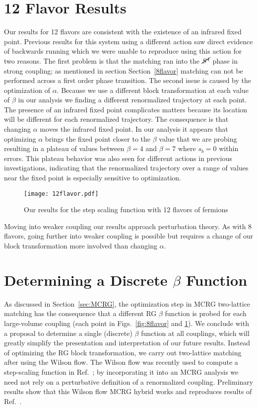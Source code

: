 \documentclass{PoS}
\newcommand{\Sb}{\ensuremath{\cancel{S^4}} }
\newcommand{\refcite}[1]{Ref.~\cite{#1}}
\newcommand{\secref}[1]{Section~\ref{#1}}
\begin{document}
\section{12 Flavor Results}
Our results for 12 flavors are consistent with the existence of an infrared fixed point.
Previous results for this system using a different action saw direct evidence of backwards running which we were unable to reproduce using this action for two reasons.
The first problem is that the matching ran into the \Sb phase in strong coupling; as mentioned in section \secref{8flavor} matching can not be performed across a first order phase transition. 
The second issue is caused by the optimization of $\alpha$.  Because we use a different block transformation at each value of $\beta$ in our analysis we finding a different renormalized trajectory at each point.
The presence of an infrared fixed point complicates matters because its location will be different for each renormalized trajectory.
The consequence is that changing $\alpha$ moves the infrared fixed point.
In our analysis it appears that optimizing $\alpha$ brings the fixed point closer to the $\beta$ value that we are probing resulting in a plateau of values between $\beta=4$ and $\beta=7$ where $s_b=0$ within errors.
This plateau behavior was also seen for different actions in previous investigations, indicating that the renormalized trajectory over a range of values near the fixed point is especially sensitive to optimization.

\begin{figure}[htpb]
  \centering
  \texttt{[image: 12flavor.pdf]}
  \caption{Our results for the step scaling function with 12 flavors of fermions}
  \label{fig:12flavor}
\end{figure}

Moving into weaker coupling our results approach perturbation theory.  As with 8 flavors, going further into weaker coupling is possible but requires a change of our block transformation more involved than changing $\alpha$.  

\section{Determining a Discrete $\beta$ Function}
As discussed in \secref{sec:MCRG}, the optimization step in MCRG two-lattice matching has the consequence that a different RG $\beta$ function is probed for each large-volume coupling (each point in Figs.~\ref{fig:8flavor} and \ref{fig:12flavor}).
We conclude with a proposal to determine a single (discrete) $\beta$ function at all couplings, which will greatly simplify the presentation and interpretation of our future results.
Instead of optimizing the RG block transformation, we carry out two-lattice matching after using the Wilson flow.
The Wilson flow was recently used to compute a step-scaling function in \refcite{Fodor:2012td}; by incorporating it into an MCRG analysis we need not rely on a perturbative definition of a renormalized coupling.
Preliminary results show that this Wilson flow MCRG hybrid works and reproduces results of \refcite{Fodor:2012td}.
\end{document}
